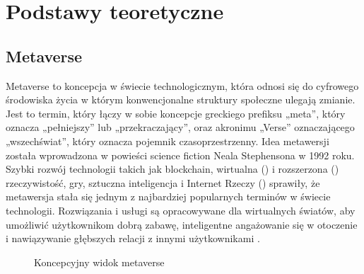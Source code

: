 
\chapter{Podstawy teoretyczne}
\section{Metaverse}


Metaverse to koncepcja w świecie technologicznym, która odnosi się do cyfrowego środowiska życia w którym konwencjonalne struktury społeczne ulegają zmianie. Jest to termin, który łączy w sobie koncepcje greckiego prefiksu „meta”, który oznacza „pełniejszy” lub „przekraczający”, oraz akronimu „Verse” oznaczającego „wszechświat”, który oznacza pojemnik czasoprzestrzenny. Idea metawersji została wprowadzona w powieści science fiction Neala Stephensona  w 1992 roku. Szybki rozwój technologii takich jak blockchain, wirtualna () i rozszerzona () rzeczywistość, gry, sztuczna inteligencja i Internet Rzeczy  () sprawiły, że metawersja stała się jednym z najbardziej popularnych terminów w świecie technologii. Rozwiązania i usługi są opracowywane dla wirtualnych światów, aby umożliwić użytkownikom dobrą zabawę, inteligentne angażowanie się w otoczenie i nawiązywanie głębszych relacji z innymi użytkownikami \cite{metaverseAsAService}. 

\begin{figure}[h!]
    \centering
    
    \caption{Koncepcyjny widok metaverse\cite{metaverseUseCaseslee}}
    \label{fig:enter-label}
\end{figure}

